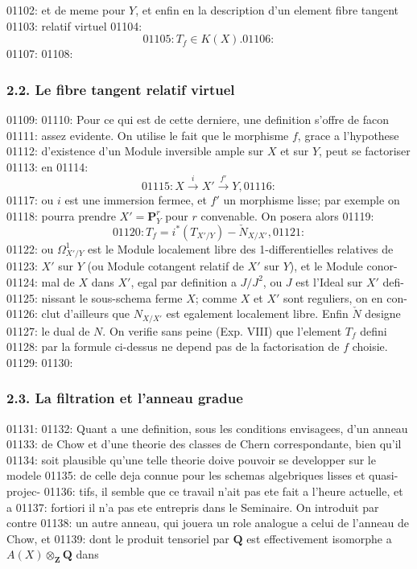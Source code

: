 01102: et de meme pour $Y$, et enfin en la description d'un element fibre tangent
01103: relatif virtuel
01104: \[
01105: T_f \in K(X).
01106: \]
01107: 
01108: \subsubsection*{2.2. Le fibre tangent relatif virtuel}
01109: 
01110: Pour ce qui est de cette derniere, une definition s'offre de facon
01111: assez evidente. On utilise le fait que le morphisme $f$, grace a l'hypothese
01112: d'existence d'un Module inversible ample sur $X$ et sur $Y$, peut se factoriser
01113: en
01114: \begin{equation}
01115: X \xrightarrow{i} X' \xrightarrow{f'} Y,
01116: \end{equation}
01117: ou $i$ est une immersion fermee, et $f'$ un morphisme lisse; par exemple on
01118: pourra prendre $X' = \mathbf{P}^r_Y$ pour $r$ convenable. On posera alors
01119: \begin{equation}
01120: T_f = i^{*}(T_{X'/Y}) - \check{N}_{X/X'},
01121: \end{equation}
01122: ou $\Omega^1_{X'/Y}$ est le Module localement libre des 1-differentielles relatives de
01123: $X'$ sur $Y$ (ou Module cotangent relatif de $X'$ sur $Y$), et le Module conor-
01124: mal de $X$ dans $X'$, egal par definition a $J/J^2$, ou $J$ est l'Ideal sur $X'$ defi-
01125: nissant le sous-schema ferme $X$; comme $X$ et $X'$ sont reguliers, on en con-
01126: clut d'ailleurs que $N_{X/X'}$ est egalement localement libre. Enfin $\check{N}$ designe
01127: le dual de $N$. On verifie sans peine (Exp. VIII) que l'element $T_f$ defini
01128: par la formule ci-dessus ne depend pas de la factorisation de $f$ choisie.
01129: 
01130: \subsubsection*{2.3. La filtration et l'anneau gradue}
01131: 
01132: Quant a une definition, sous les conditions envisagees, d'un anneau
01133: de Chow et d'une theorie des classes de Chern correspondante, bien qu'il
01134: soit plausible qu'une telle theorie doive pouvoir se developper sur le modele
01135: de celle deja connue pour les schemas algebriques lisses et quasi-projec-
01136: tifs, il semble que ce travail n'ait pas ete fait a l'heure actuelle, et a
01137: fortiori il n'a pas ete entrepris dans le Seminaire. On introduit par contre
01138: un autre anneau, qui jouera un role analogue a celui de l'anneau de Chow, et
01139: dont le produit tensoriel par $\mathbf{Q}$ est effectivement isomorphe a $A(X) \otimes_{\mathbf{Z}} \mathbf{Q}$ dans

